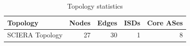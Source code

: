 \begin{table}[h]
    \centering
    \begin{tabular}{lrrrr}
        \toprule
        Topology & Nodes & Edges & ISDs & Core ASes \\
        \midrule
        SCIERA Topology & 27 & 30 & 1 & 8 \\
        \bottomrule
    \end{tabular}
    \caption{Topology statistics}
    \label{tab:topology_stats}
\end{table}